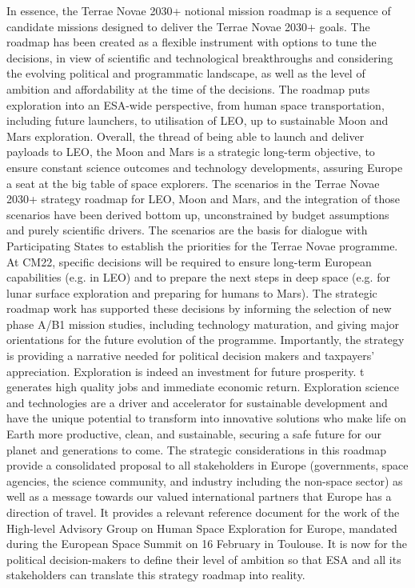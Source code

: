 \documentclass[12pt]{article}
\begin{document}
In essence, the Terrae Novae 2030+ notional mission roadmap is a sequence of candidate missions designed to deliver the Terrae Novae 2030+ goals. The roadmap has been created as a flexible instrument with options to tune the decisions, in view of scientific and technological breakthroughs and considering the evolving political and programmatic landscape, as well as the level of ambition and affordability at the time of the decisions. The roadmap puts exploration into an ESA-wide perspective, from human space transportation, including future launchers, to utilisation of LEO, up to sustainable Moon and Mars exploration. Overall, the thread of being able to launch and deliver payloads to LEO, the Moon and Mars is a strategic long-term objective, to ensure constant science outcomes and technology developments, assuring Europe a seat at the big table of space explorers. The scenarios in the Terrae Novae 2030+ strategy roadmap for LEO, Moon and Mars, and the integration of those scenarios have been derived bottom up, unconstrained by budget assumptions and purely scientific drivers. The scenarios are the basis for dialogue with Participating States to establish the priorities for the Terrae Novae programme. At CM22, specific decisions will be required to ensure long-term European capabilities (e.g. in LEO) and to prepare the next steps in deep space (e.g. for lunar surface exploration and preparing for humans to Mars). The strategic roadmap work has supported these decisions by informing the selection of new phase A/B1 mission studies, including technology maturation, and giving major orientations for the future evolution of the programme. Importantly, the strategy is providing a narrative needed for political decision makers and taxpayers’ appreciation. Exploration is indeed an investment for future prosperity. t generates high quality jobs and immediate economic return. Exploration science and technologies are a driver and accelerator for sustainable development and have the unique potential to transform into innovative solutions who make life on Earth more productive, clean, and sustainable, securing a safe future for our planet and generations to come. The strategic considerations in this roadmap provide a consolidated proposal to all stakeholders in Europe (governments, space agencies, the science community, and industry including the non-space sector) as well as a message towards our valued international partners that Europe has a direction of travel. It provides a relevant reference document for the work of the High-level Advisory Group on Human Space Exploration for Europe, mandated during the European Space Summit on 16 February in Toulouse. It is now for the political decision-makers to define their level of ambition so that ESA and all its stakeholders can translate this strategy roadmap into reality.
\end{document}
